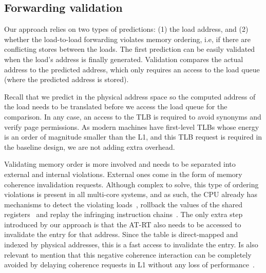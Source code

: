 \documentclass{sig-alternate}
\begin{document}

\subsection{Forwarding validation}
Our approach relies on two types of predictions: (1) the load address, and (2) whether the load-to-load forwarding violates memory ordering, i.e, if there are conflicting stores between the loads. The first prediction can be easily validated when the load's address is finally generated. Validation compares the actual address to the predicted address, which only requires an access to the load queue (where the predicted address is stored). 

Recall that we predict in the physical address space so the computed address of the load needs to be translated before we access the load queue for the comparison. In any case, an access to the TLB is required to avoid synonyms and verify page permissions. As modern machines have first-level TLBs whose energy is an order of magnitude smaller than the L1, and this TLB request is required in the baseline design, we are not adding extra overhead.

Validating memory order is more involved and needs to be separated into external and internal violations. External ones come in the form of memory coherence invalidation requests. Although complex to solve, this type of ordering violations is present in all multi-core systems, and as such, the CPU already has mechanisms to detect the violating loads~\cite{SVW/roth05}, rollback the values of the shared registers~\cite{ISRB/perais16} and replay the infringing instruction chains~\cite{Bank/perais15}. The only extra step introduced by our approach is that the AT-RT also needs to be accessed to invalidate the entry for that address. Since the table is direct-mapped and indexed by physical addresses, this is a fast access to invalidate the entry. Is also relevant to mention that this negative coherence interaction can be completely avoided by delaying coherence requests in L1 without any loss of performance~\cite{ros2018superfluous}.
\end{document}
